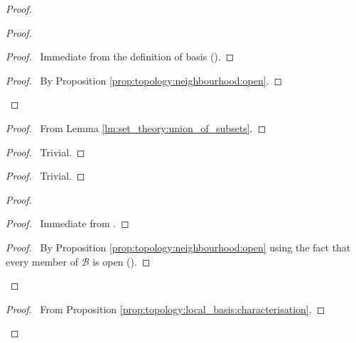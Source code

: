 \documentclass{report}
\let\qed\relax
\theoremstyle{definition}
\begin{document}
  \begin{proof}
    \pf
    \begin{proof}
      \begin{proof}
        \pf\ Immediate from the definition of basis ().
      \end{proof}
      \begin{proof}
        \pf\ By Proposition \ref{prop:topology:neighbourhood:open}.
      \end{proof}
    \end{proof}
    \begin{proof}
      \pf\ From Lemma \ref{lm:set_theory:union_of_subsets}.
    \end{proof}
    \begin{proof}
      \pf\ Trivial.
    \end{proof}
    \begin{proof}
      \pf\ Trivial.
    \end{proof}
    \begin{proof}
      \pf
      \begin{proof}
        \pf\ Immediate from .
      \end{proof}
      \begin{proof}
        \pf\ By Proposition \ref{prop:topology:neighbourhood:open} using the
        fact that every member of $\mathcal{B}$ is open ().
      \end{proof}
    \end{proof}
    \begin{proof}
      \pf\ From Proposition \ref{prop:topology:local_basis:characterisation}.
    \end{proof}
    \qed
  \end{proof}
\end{document}

